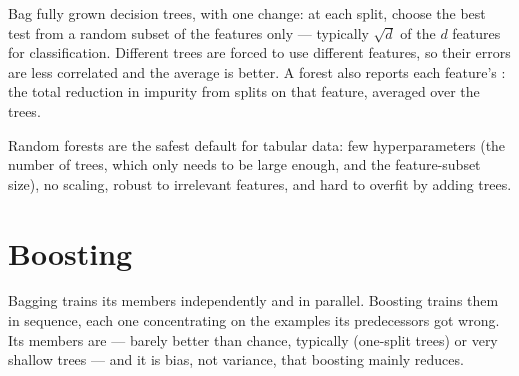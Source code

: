\begin{definitionbox}
Bag fully grown decision trees, with one change: at each split, choose the best test
from a random subset of the features only --- typically $\sqrt{d}$ of the $d$
features for classification. Different trees are forced to use different features,
so their errors are less correlated and the average is better. A forest also
reports each feature's : the total reduction in impurity from splits
on that feature, averaged over the trees.
\end{definitionbox}

Random forests are the safest default for tabular data: few hyperparameters (the
number of trees, which only needs to be large enough, and the feature-subset size),
no scaling, robust to irrelevant features, and hard to overfit by adding trees.

\section{Boosting}

Bagging trains its members independently and in parallel. Boosting trains them in
sequence, each one concentrating on the examples its predecessors got wrong. Its
members are  --- barely better than chance, typically
 (one-split trees) or very shallow trees --- and it is bias,
not variance, that boosting mainly reduces.

